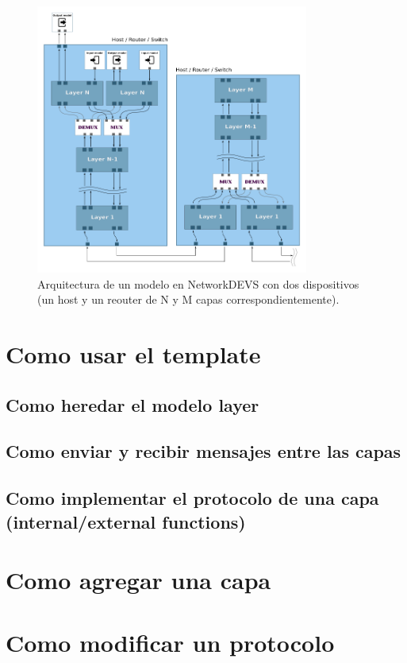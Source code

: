 \documentclass[10pt,a4paper]{article}
\begin{document}
\begin{figure}[htbp]
    \centering
    \includegraphics[width = 0.8\textwidth]{png/multi_layer_model.png}
    \caption{Arquitectura de un modelo en NetworkDEVS con dos dispositivos (un host y un reouter de N y M capas correspondientemente).}
    \label{figure:general architecture}
\end{figure}

\section{Como usar el template}
\subsection{Como heredar el modelo layer}
\subsection{Como enviar y recibir mensajes entre las capas}
\subsection{Como implementar el protocolo de una capa (internal/external functions)}
\section{Como agregar una capa}
\section{Como modificar un protocolo}
\end{document}
